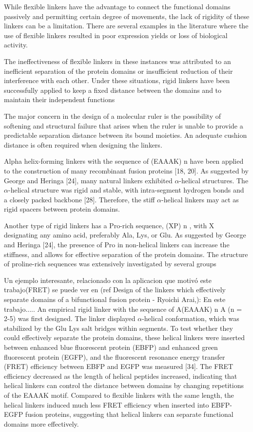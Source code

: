 While flexible linkers have the advantage to connect the functional domains passively and
permitting certain degree of movements, the lack of rigidity of these linkers can be a
limitation. There are several examples in the literature where the use of flexible linkers
resulted in poor expression yields or loss of biological activity.

The ineffectiveness of flexible linkers in these
instances was attributed to an inefficient separation of the protein domains or insufficient
reduction of their interference with each other. Under these situations, rigid linkers have
been successfully applied to keep a fixed distance between the domains and to maintain their
independent functions

The major concern in the design of a molecular ruler is the possibility of softening and structural failure that arises when the ruler is unable to provide a predictable separation distance between its bound
moieties. An adequate cushion distance is often required when designing the linkers.

Alpha helix-forming linkers with the sequence of (EAAAK) n have been applied to the
construction of many recombinant fusion proteins [18, 20]. As suggested by George and
Heringa [24], many natural linkers exhibited $\alpha$-helical structures. The $\alpha$-helical structure
was rigid and stable, with intra-segment hydrogen bonds and a closely packed backbone
[28]. Therefore, the stiff $\alpha$-helical linkers may act as rigid spacers between protein domains.


Another type of rigid linkers has a Pro-rich sequence, (XP) n , with X designating any amino
acid, preferably Ala, Lys, or Glu. As suggested by George and Heringa [24], the presence of
Pro in non-helical linkers can increase the stiffness, and allows for effective separation of
the protein domains. The structure of proline-rich sequences was extensively investigated by
several groups

Un ejemplo interesante, relacionado con la aplicacion que motivó este trabajo(FRET) se puede ver en (ref Design of the linkers which effectively separate domains of a bifunctional fusion protein - Ryoichi Arai,): 
En este trabajo.....
An empirical rigid linker with the sequence of A(EAAAK) n A (n = 2-5) was first designed.
The linker displayed  $\alpha$-helical conformation, which was stabilized by
the Glu Lys salt bridges within segments. To test whether they could effectively separate
the protein domains, these helical linkers were inserted between enhanced blue fluorescent
protein (EBFP) and enhanced green fluorescent protein (EGFP), and the fluorescent
resonance energy transfer (FRET) efficiency between EBFP and EGFP was measured [34].
The FRET efficiency decreased as the length of helical peptides increased, indicating that
helical linkers can control the distance between domains by changing repetitions of the
EAAAK motif. Compared to flexible linkers with the same length, the helical linkers
induced much less FRET efficiency when inserted into EBFP-EGFP fusion proteins,
suggesting that helical linkers can separate functional domains more effectively.


